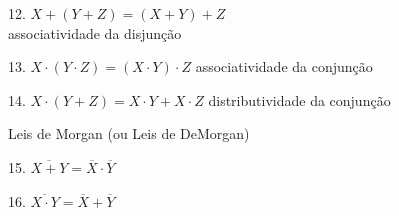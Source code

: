 \documentclass{beamer}
\begin{document}
\begin{frame}
\vspace{12pt}

\begin{minipage}[t]{0.54\textwidth}
 12. $X + (Y + Z) = (X + Y) + Z$ \\
 \footnotesize{associatividade da disjunção}
\end{minipage}
%
\begin{minipage}[t]{0.34\textwidth}
 13. $X \cdot (Y \cdot Z) = (X \cdot Y) \cdot Z$
 \footnotesize{associatividade da conjunção}
\end{minipage}

\vspace{12pt}

14. $X \cdot (Y + Z) = X \cdot Y + X \cdot Z$ \hspace{1ex}
{\footnotesize{distributividade da conjunção}}

\vspace{6pt}

Leis de Morgan (ou Leis de DeMorgan)

\vspace{6pt}

\begin{minipage}[t]{0.34\textwidth}
 15. $\overline{X + Y} = \overline{X} \cdot \overline{Y}$
\end{minipage}
%
\begin{minipage}[t]{0.31\textwidth}
 16. $\overline{X \cdot Y} = \overline{X} + \overline{Y}$ 
\end{minipage}

\end{frame}

\newcommand{\Not}[1]{\overline{#1}}
\newcommand{\AND}{\cdot}
\newcommand{\OR}{+}
\newcommand{\XOR}{\oplus}
\newcommand{\Mt}[4]{#1 \hspace{-1.5pt} \AND \hspace{-1.5pt} #2 \hspace{-1.5pt}%
\AND \hspace{-1.5pt} #3 \hspace{-1.5pt} \AND #4}

\end{document}
